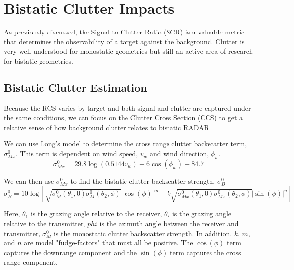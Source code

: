 \section{Bistatic Clutter Impacts}

As previously discussed, the Signal to Clutter Ratio (SCR) is a valuable metric that determines the observability of a target against the background. Clutter is very well understood for monostatic geometries but still an active area of research for bistatic geometries.

\subsection {Bistatic Clutter Estimation}
Because the RCS varies by target and both signal and clutter are captured under the same conditions, we can focus on the Clutter Cross Section (CCS) to get a relative sense of how background clutter relates to bistatic RADAR.

We can use Long's model to determine the cross range clutter backscatter term, $\sigma_{Mx}^0$. This term is dependent on wind speed, $v_w$ and wind direction, $\phi_w$.
\begin{equation}
\sigma_{Mx}^0 = 29.8\log\left(0.5144 v_w\right) + 6\cos\left(\phi_w \right) -84.7
\label{bc_eq:1}
\end{equation}
\renewcommand{\baselinestretch}{2} \small\normalsize

We can then use $\sigma_{Mx}^0$ to find the bistatic clutter backscatter strength, $\sigma_{B}^0$
\begin{equation}
\sigma_B^0 = 10\log\left[\sqrt{\sigma_M^0(\theta_1,0)\sigma_M^0(\theta_2,\phi)} |\cos(\phi)|^m  + k\sqrt{\sigma_{Mx}^0(\theta_1,0)\sigma_{Mx}^0(\theta_2,\phi)}|\sin(\phi)|^n \right]
\label{bc_eq:2}
\end{equation}
\renewcommand{\baselinestretch}{2} \small\normalsize

Here, $\theta_1$ is the grazing angle relative to the receiver, $\theta_2$ is the grazing angle relative to the transmitter, $phi$ is the azimuth angle between the receiver and transmitter, $\sigma_M^0$ is the monostatic clutter backscatter strength. In addition, $k$, $m$, and $n$ are model "fudge-factors" that must all be positive. The $\cos(\phi)$ term captures the downrange component and the $\sin(\phi)$ term captures the cross range component.

